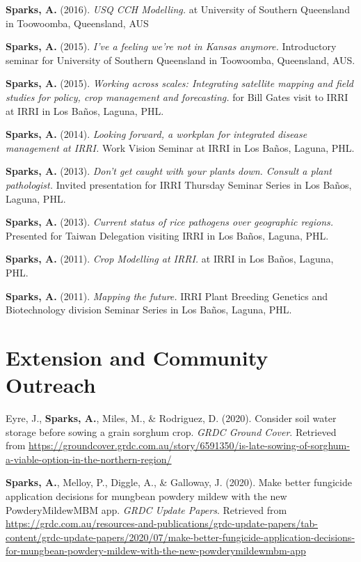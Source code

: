 \documentclass[11pt, a4paper]{awesome-cv}
\begin{document}
\textbf{Sparks, A.} (2016). \emph{USQ CCH Modelling.} at University of
Southern Queensland in Toowoomba, Queensland, AUS

\textbf{Sparks, A.} (2015). \emph{I've a feeling we're not in Kansas
anymore.} Introductory seminar for University of Southern Queensland in
Toowoomba, Queensland, AUS.

\textbf{Sparks, A.} (2015). \emph{Working across scales: Integrating
satellite mapping and field studies for policy, crop management and
forecasting.} for Bill Gates visit to IRRI at IRRI in Los Baños, Laguna,
PHL.

\textbf{Sparks, A.} (2014). \emph{Looking forward, a workplan for
integrated disease management at IRRI.} Work Vision Seminar at IRRI in
Los Baños, Laguna, PHL.

\textbf{Sparks, A.} (2013). \emph{Don't get caught with your plants
down. Consult a plant pathologist.} Invited presentation for IRRI
Thursday Seminar Series in Los Baños, Laguna, PHL.

\textbf{Sparks, A.} (2013). \emph{Current status of rice pathogens over
geographic regions.} Presented for Taiwan Delegation visiting IRRI in
Los Baños, Laguna, PHL.

\textbf{Sparks, A.} (2011). \emph{Crop Modelling at IRRI.} at IRRI in
Los Baños, Laguna, PHL.

\textbf{Sparks, A.} (2011). \emph{Mapping the future.} IRRI Plant
Breeding Genetics and Biotechnology division Seminar Series in Los
Baños, Laguna, PHL.

\endgroup

\hypertarget{extension-and-community-outreach}{%
\section{Extension and Community
Outreach}\label{extension-and-community-outreach}}

\begingroup
\setlength{\parindent}{-0.5in}
\setlength{\leftskip}{0.5in}

\hypertarget{refs_extension}{}
\leavevmode\hypertarget{ref-Eyre2020}{}%
Eyre, J., \textbf{Sparks, A.}, Miles, M., \& Rodriguez, D. (2020).
Consider soil water storage before sowing a grain sorghum crop.
\emph{GRDC Ground Cover}. Retrieved from
\url{https://groundcover.grdc.com.au/story/6591350/is-late-sowing-of-sorghum-a-viable-option-in-the-northern-region/}

\leavevmode\hypertarget{ref-Sparks2020}{}%
\textbf{Sparks, A.}, Melloy, P., Diggle, A., \& Galloway, J. (2020).
Make better fungicide application decisions for mungbean powdery mildew
with the new {PowderyMildewMBM} app. \emph{{GRDC} Update Papers}.
Retrieved from
\url{https://grdc.com.au/resources-and-publications/grdc-update-papers/tab-content/grdc-update-papers/2020/07/make-better-fungicide-application-decisions-for-mungbean-powdery-mildew-with-the-new-powderymildewmbm-app}
\end{document}
